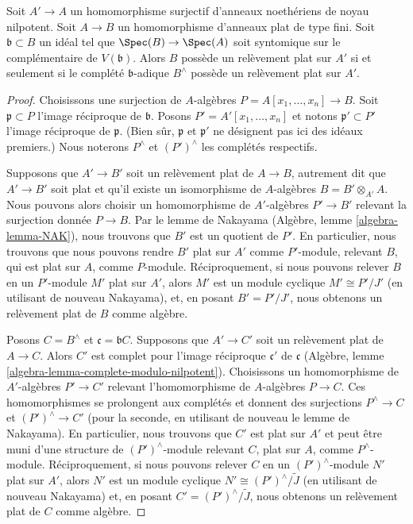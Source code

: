 \begin{lemma}
\label{lemma-lift-equivalence}
Soit $A' \to A$ un homomorphisme surjectif d'anneaux noethériens de noyau nilpotent.
Soit $A \to B$ un homomorphisme d'anneaux plat de type fini.
Soit $\mathfrak b \subset B$ un idéal tel que
$\Spec(B) \to \Spec(A)$ soit syntomique sur le complémentaire de $V(\mathfrak b)$.
Alors $B$ possède un relèvement plat sur $A'$ si et seulement si le complété
$\mathfrak b$-adique $B^\wedge$ possède un relèvement plat sur $A'$.
\end{lemma}

\begin{proof}
Choisissons une surjection de $A$-algèbres $P = A[x_1, \ldots, x_n] \to B$.
Soit $\mathfrak p \subset P$ l'image réciproque de $\mathfrak b$.
Posons $P' = A'[x_1, \ldots, x_n]$ et notons $\mathfrak p' \subset P'$
l'image réciproque de $\mathfrak p$. (Bien sûr, $\mathfrak p$
et $\mathfrak p'$ ne désignent pas ici des idéaux premiers.)
Nous noterons $P^\wedge$ et $(P')^\wedge$ les complétés respectifs.

\medskip\noindent
Supposons que $A' \to B'$ soit un relèvement plat de $A \to B$, autrement dit
que $A' \to B'$ soit plat et qu'il existe un isomorphisme de $A$-algèbres
$B = B' \otimes_{A'} A$. Nous pouvons alors choisir un homomorphisme de $A'$-algèbres
$P' \to B'$ relevant la surjection donnée $P \to B$.
Par le lemme de Nakayama (Algèbre, lemme \ref{algebra-lemma-NAK}),
nous trouvons que $B'$ est un quotient de $P'$. En particulier, nous trouvons
que nous pouvons rendre $B'$ plat sur $A'$ comme $P'$-module,
relevant $B$, qui est plat sur $A$, comme $P$-module.
Réciproquement, si nous pouvons relever $B$ en un $P'$-module $M'$ plat sur $A'$,
alors $M'$ est un module cyclique $M' \cong P'/J'$ (en utilisant de nouveau Nakayama),
et, en posant $B' = P'/J'$, nous obtenons un relèvement plat de $B$ comme algèbre.

\medskip\noindent
Posons $C = B^\wedge$ et $\mathfrak c = \mathfrak bC$.
Supposons que $A' \to C'$ soit un relèvement plat de $A \to C$.
Alors $C'$ est complet pour l'image réciproque $\mathfrak c'$
de $\mathfrak c$
(Algèbre, lemme \ref{algebra-lemma-complete-modulo-nilpotent}).
Choisissons un homomorphisme de $A'$-algèbres $P' \to C'$ relevant
l'homomorphisme de $A$-algèbres $P \to C$. Ces homomorphismes se prolongent aux
complétés et donnent des surjections $P^\wedge \to C$ et $(P')^\wedge \to C'$
(pour la seconde, en utilisant de nouveau le lemme de Nakayama).
En particulier, nous trouvons que $C'$ est plat sur $A'$ et peut être muni d'une structure de
$(P')^\wedge$-module relevant $C$, plat sur $A$, comme $P^\wedge$-module.
Réciproquement, si nous pouvons relever $C$ en un $(P')^\wedge$-module $N'$ plat sur $A'$,
alors $N'$ est un module cyclique $N' \cong (P')^\wedge/\tilde J$
(en utilisant de nouveau Nakayama) et, en posant $C' = (P')^\wedge/\tilde J$,
nous obtenons un relèvement plat de $C$ comme algèbre.


\end{proof}
